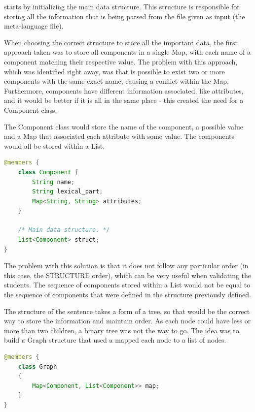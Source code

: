 \noindent starts by initializing the main data structure. This structure is responsible for storing all the information that is being parsed from the file given as input (the meta-language file). 

When choosing the correct structure to store all the important data, the first \/\*approach\*\/ taken was to store all components in a single Map, with each name of a component
matching their respective value. The problem with this approach, which was identified right away, was that is possible to exist two or more components with the same exact
name, causing a conflict within the Map. Furthermore, components have different information associated, like attributes, and it would be better if it is all in the same
place - this created the need for a Component class.

The Component class would store the name of the component, a possible value and a Map that associated each attribute with some value. The components would all be stored
within a List.
\newpage

\begin{center}
\begin{minipage}{10cm}
\begin{lstlisting}[language=java, basicstyle=\small, label={lst:component_class}, caption=Component class]
@members {
    class Component {
        String name;
        String lexical_part;
        Map<String, String> attributes;
    }

    /* Main data structure. */
    List<Component> struct;
}
\end{lstlisting}
\end{minipage}
\end{center}

The problem with this solution is that it does not follow any particular order (in this case, the STRUCTURE order), which can be very useful when validating the students.
The sequence of components stored within a List would not be equal to the sequence of components that were defined in the structure previously defined.

The structure of the sentence takes a form of a tree, so that would be the correct way to store the information and maintain order. As each node could have less or more 
than two children, a binary tree was not the way to go. The idea was to build a Graph structure that used a mapped each node to a list of nodes.

\begin{center}
\begin{minipage}{11cm}
\begin{lstlisting}[language=java, basicstyle=\small, label={lst:graph_class}, caption=Graph class]
@members {
    class Graph
    {
        Map<Component, List<Component>> map;
    }
}
\end{lstlisting}
\end{minipage}
\end{center}


